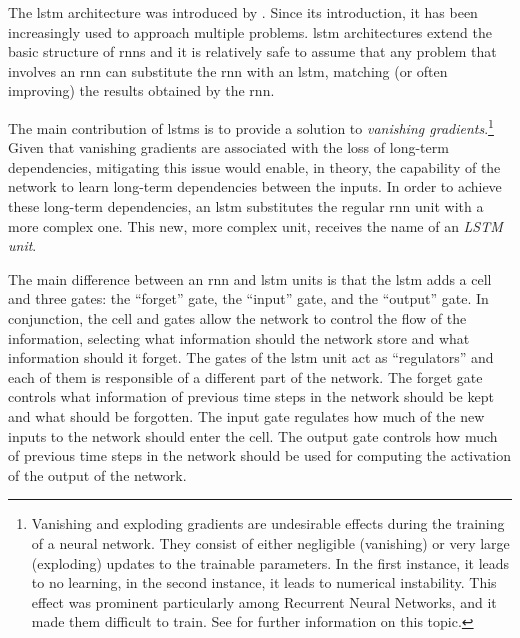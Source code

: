 

The \gls{lstm} architecture was introduced by
\textcite{hochreiter1997long}. Since its introduction, it
has been increasingly used to approach multiple problems.
\gls{lstm} architectures extend the basic structure of
\glspl{rnn} and it is relatively safe to assume that any
problem that involves an \gls{rnn} can substitute the
\gls{rnn} with an \gls{lstm}, matching (or often improving)
the results obtained by the \gls{rnn}.

The main contribution of \glspl{lstm} is to provide a
solution to \emph{vanishing gradients}.\footnote{Vanishing
and exploding gradients are undesirable effects during the
training of a neural network. They consist of either
negligible (vanishing) or very large (exploding) updates to
the trainable parameters. In the first instance, it leads to
no learning, in the second instance, it leads to numerical
instability. This effect was prominent particularly among
Recurrent Neural Networks, and it made them difficult to
train. See \textcite{bengio1994learning} for further
information on this topic.} Given that vanishing gradients
are associated with the loss of long-term dependencies,
mitigating this issue would enable, in theory, the
capability of the network to learn long-term dependencies
between the inputs. In order to achieve these long-term
dependencies, an \gls{lstm} substitutes the regular
\gls{rnn} unit with a more complex one. This new, more
complex unit, receives the name of an \emph{LSTM unit}.

The main difference between an \gls{rnn} and \gls{lstm}
units is that the \gls{lstm} adds a cell and three gates:
the ``forget'' gate, the ``input'' gate, and the ``output''
gate. In conjunction, the cell and gates allow the network
to control the flow of the information, selecting what
information should the network store and what information
should it forget. The gates of the \gls{lstm} unit act as
``regulators'' and each of them is responsible of a
different part of the network. The forget gate controls what
information of previous time steps in the network should be
kept and what should be forgotten. The input gate regulates
how much of the new inputs to the network should enter the
cell. The output gate controls how much of previous time
steps in the network should be used for computing the
activation of the output of the network.
